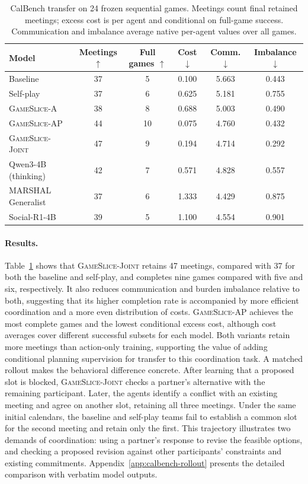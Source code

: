 \begin{table}[t]
\caption{CalBench transfer on 24 frozen sequential games. Meetings count
final retained meetings; excess cost is per agent and conditional on full-game
success. Communication and imbalance average native per-agent values over all
games.}
\label{tab:experiment-calbench}
\centering\small
\setlength{\tabcolsep}{4pt}
\begin{tabular}{lccccc}
\hline
Model & Meetings $\uparrow$ & Full games $\uparrow$ & Cost $\downarrow$ & Comm. $\downarrow$ & Imbalance $\downarrow$ \\
\hline
Baseline & 37 & 5 & 0.100 & 5.663 & 0.443 \\
Self-play & 37 & 6 & 0.625 & 5.181 & 0.755 \\
\textsc{GameSlice-A} & 38 & 8 & 0.688 & 5.003 & 0.490 \\
\textsc{GameSlice-AP} & 44 & 10 & 0.075 & 4.760 & 0.432 \\
\textsc{GameSlice-Joint} & 47 & 9 & 0.194 & 4.714 & 0.292 \\
\hline
Qwen3-4B (thinking) & 42 & 7 & 0.571 & 4.828 & 0.557 \\
MARSHAL Generalist & 37 & 6 & 1.333 & 4.429 & 0.875 \\
Social-R1-4B & 39 & 5 & 1.100 & 4.554 & 0.901 \\
\hline
\end{tabular}
\end{table}

\paragraph{Results.}
Table~\ref{tab:experiment-calbench} shows that \textsc{GameSlice-Joint}
retains 47 meetings, compared with 37 for both the baseline and self-play,
and completes nine games compared with five and six, respectively. It also
reduces communication and burden imbalance relative to both, suggesting
that its higher completion rate is accompanied by more efficient
coordination and a more even distribution of costs.
\textsc{GameSlice-AP} achieves the most complete games and the lowest
conditional excess cost, although cost averages cover different successful
subsets for each model. Both variants retain more meetings than action-only
training, supporting the value of adding conditional planning supervision
for transfer to this coordination task. A matched rollout makes the behavioral difference concrete. After learning
that a proposed slot is blocked, \textsc{GameSlice-Joint} checks a partner's
alternative with the remaining participant. Later, the agents identify a
conflict with an existing meeting and agree on another slot, retaining all
three meetings. Under the same initial calendars, the baseline and self-play
teams fail to establish a common slot for the second meeting and retain only
the first. This trajectory illustrates two demands of coordination: using a
partner's response to revise the feasible options, and checking a proposed
revision against other participants' constraints and existing commitments.
Appendix~\ref{app:calbench-rollout} presents the detailed comparison
with verbatim model outputs.
